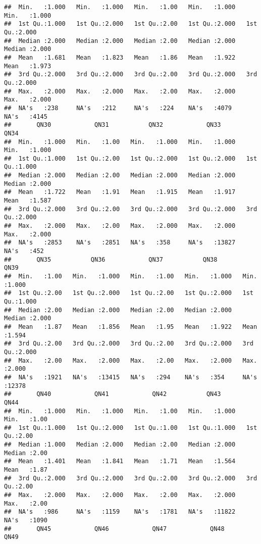 \documentclass[
]{article}
\begin{document}
\begin{verbatim}
##  Min.   :1.000   Min.   :1.000   Min.   :1.00   Min.   :1.000   Min.   :1.000  
##  1st Qu.:1.000   1st Qu.:2.000   1st Qu.:2.00   1st Qu.:2.000   1st Qu.:2.000  
##  Median :2.000   Median :2.000   Median :2.00   Median :2.000   Median :2.000  
##  Mean   :1.681   Mean   :1.823   Mean   :1.86   Mean   :1.922   Mean   :1.973  
##  3rd Qu.:2.000   3rd Qu.:2.000   3rd Qu.:2.00   3rd Qu.:2.000   3rd Qu.:2.000  
##  Max.   :2.000   Max.   :2.000   Max.   :2.00   Max.   :2.000   Max.   :2.000  
##  NA's   :238     NA's   :212     NA's   :224    NA's   :4079    NA's   :4145   
##       QN30            QN31           QN32            QN33            QN34      
##  Min.   :1.000   Min.   :1.00   Min.   :1.000   Min.   :1.000   Min.   :1.000  
##  1st Qu.:1.000   1st Qu.:2.00   1st Qu.:2.000   1st Qu.:2.000   1st Qu.:1.000  
##  Median :2.000   Median :2.00   Median :2.000   Median :2.000   Median :2.000  
##  Mean   :1.722   Mean   :1.91   Mean   :1.915   Mean   :1.917   Mean   :1.587  
##  3rd Qu.:2.000   3rd Qu.:2.00   3rd Qu.:2.000   3rd Qu.:2.000   3rd Qu.:2.000  
##  Max.   :2.000   Max.   :2.00   Max.   :2.000   Max.   :2.000   Max.   :2.000  
##  NA's   :2853    NA's   :2851   NA's   :358     NA's   :13827   NA's   :452    
##       QN35           QN36            QN37           QN38            QN39      
##  Min.   :1.00   Min.   :1.000   Min.   :1.00   Min.   :1.000   Min.   :1.000  
##  1st Qu.:2.00   1st Qu.:2.000   1st Qu.:2.00   1st Qu.:2.000   1st Qu.:1.000  
##  Median :2.00   Median :2.000   Median :2.00   Median :2.000   Median :2.000  
##  Mean   :1.87   Mean   :1.856   Mean   :1.95   Mean   :1.922   Mean   :1.594  
##  3rd Qu.:2.00   3rd Qu.:2.000   3rd Qu.:2.00   3rd Qu.:2.000   3rd Qu.:2.000  
##  Max.   :2.00   Max.   :2.000   Max.   :2.00   Max.   :2.000   Max.   :2.000  
##  NA's   :1921   NA's   :13415   NA's   :294    NA's   :354     NA's   :12378  
##       QN40            QN41            QN42           QN43            QN44     
##  Min.   :1.000   Min.   :1.000   Min.   :1.00   Min.   :1.000   Min.   :1.00  
##  1st Qu.:1.000   1st Qu.:2.000   1st Qu.:1.00   1st Qu.:1.000   1st Qu.:2.00  
##  Median :1.000   Median :2.000   Median :2.00   Median :2.000   Median :2.00  
##  Mean   :1.401   Mean   :1.841   Mean   :1.71   Mean   :1.564   Mean   :1.87  
##  3rd Qu.:2.000   3rd Qu.:2.000   3rd Qu.:2.00   3rd Qu.:2.000   3rd Qu.:2.00  
##  Max.   :2.000   Max.   :2.000   Max.   :2.00   Max.   :2.000   Max.   :2.00  
##  NA's   :986     NA's   :1159    NA's   :1781   NA's   :11822   NA's   :1090  
##       QN45            QN46            QN47            QN48            QN49     

\end{verbatim}
\end{document}
